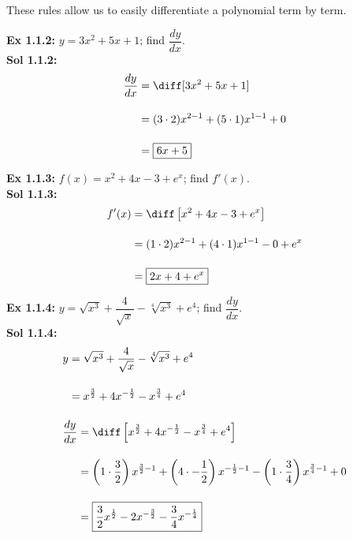 These rules allow us to easily differentiate a polynomial term by term.

\textbf{Ex 1.1.2:} $y = 3x^2 + 5x + 1$; find $\dfrac{dy}{dx}$. \\[11pt]
\textbf{Sol 1.1.2:} \begin{align*}
    \dfrac{dy}{dx} & = \diff[3x^2 + 5x + 1] \\[11pt]
    & = (3 \cdot 2)x^{2 - 1} + (5 \cdot 1)x^{1 - 1} + 0 \\[11pt]
    & = \boxed{6x + 5} \\
\end{align*}

\textbf{Ex 1.1.3:} $f(x) = x^2 + 4x - 3 + e^x$; find $f'(x)$. \\[11pt]
\textbf{Sol 1.1.3:} \begin{align*}
    f'(x) & = \diff\left[x^2 + 4x - 3 + e^x\right] \\[11pt]
    & = (1 \cdot 2)x^{2 - 1} + (4 \cdot 1)x^{1 - 1} - 0 + e^x \\[11pt]
    & = \boxed{2x + 4 + e^x} \\
\end{align*}

\textbf{Ex 1.1.4:} $y = \sqrt{x^3} + \dfrac{4}{\sqrt{x}} - \sqrt[4]{x^3} + e^4$; find $\dfrac{dy}{dx}$. \\[11pt]
\textbf{Sol 1.1.4:} \begin{align*}
    & y \begin{aligned}[t]
        & = \sqrt{x^3} + \frac{4}{\sqrt{x}} - \sqrt[4]{x^3} + e^4 \\[11pt]
        & = x^{\frac{3}{2}} + 4x^{-\frac{1}{2}} - x^{\frac{3}{4}} + e^4
    \end{aligned} \\[11pt]
    & \frac{dy}{dx} \begin{aligned}[t]
        & = \diff\left[x^{\frac{3}{2}} + 4x^{-\frac{1}{2}} - x^{\frac{3}{4}} + e^4\right] \\[11pt]
        & = \left(1 \cdot \dfrac{3}{2}\right)x^{\frac{3}{2} - 1} + \left(4 \cdot -\dfrac{1}{2}\right)x^{-\frac{1}{2} - 1} - \left(1 \cdot \dfrac{3}{4}\right)x^{\frac{3}{4} - 1} + 0 \\[11pt]
        & =\boxed{\dfrac{3}{2}x^{\frac{1}{2}} - 2x^{-\frac{3}{2}} - \dfrac{3}{4}x^{-\frac{1}{4}}} \\
    \end{aligned}
\end{align*}

